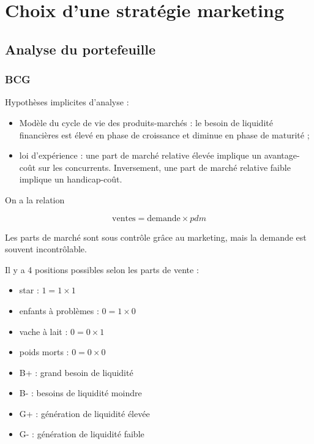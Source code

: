 
		
		
\chapter{Choix d'une stratégie marketing}
	

	\section{Analyse du portefeuille}
	
		\subsection{BCG}
	
		Hypothèses implicites d'analyse : 
		
		\begin{itemize}
			\item Modèle du cycle de vie des produits-marchés : le besoin de liquidité financières est élevé en phase de croissance et diminue en phase de maturité ;
			
			\item loi d'expérience : une part de marché relative élevée implique un avantage-coût sur les concurrents. Inversement, une part de marché relative faible implique un handicap-coût.
			
		\end{itemize}
		
		On a la relation
	
	$$\text{ventes} = \text{demande} \times pdm$$
	
	Les parts de marché sont sous contrôle grâce au marketing, mais la demande est souvent incontrôlable.
	
	Il y a 4 positions possibles selon les parts de vente :
	
	\begin{itemize}
		\item star : $1 = 1 \times 1$
		\item enfants à problèmes : $0 = 1 \times 0$
		\item vache à lait : $0 = 0 \times 1$
		\item poids morts : $0 = 0 \times 0$
	\end{itemize}
		
		
	
	\begin{itemize}
		\item {\color{red}B+} : grand besoin de liquidité 
		\item {\color{green}B-} : besoins de liquidité moindre
		\item {\color{blue}G+} : génération de liquidité élevée
		\item {\color{orange}G-} : génération de liquidité faible
	\end{itemize}
	
